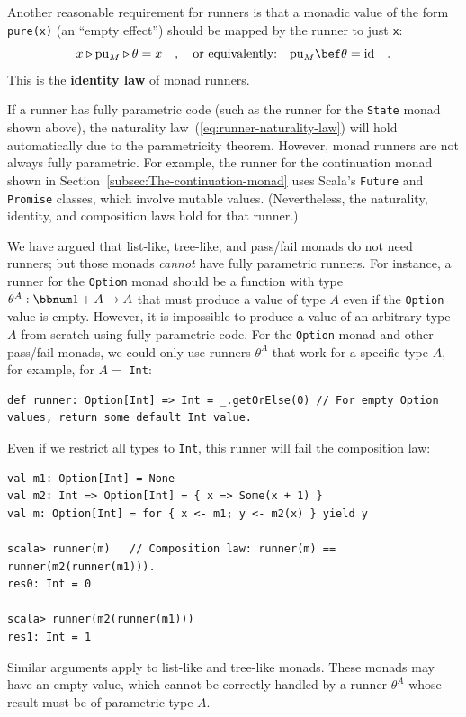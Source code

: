 \noindent Another reasonable requirement for runners is that a monadic
value of the form \lstinline!pure(x)! (an \textsf{``}empty effect\textsf{''}) should
be mapped by the runner to just \lstinline!x!:
\[
x\triangleright\text{pu}_{M}\triangleright\theta=x\quad,\quad\text{or equivalently:}\quad\text{pu}_{M}\bef\theta=\text{id}\quad.
\]
This is the \textbf{identity
law} of monad runners.

If a runner has fully parametric code (such as the runner for the
\lstinline!State! monad shown above), the naturality law~(\ref{eq:runner-naturality-law})
will hold automatically due to the parametricity theorem. However,
monad runners are not always fully parametric. For example, the runner
for the continuation monad shown in Section~\ref{subsec:The-continuation-monad}
uses Scala\textsf{'}s \lstinline!Future! and \lstinline!Promise! classes,
which involve mutable values. (Nevertheless, the naturality, identity,
and composition laws hold for that runner.)

We have argued that list-like, tree-like, and pass/fail monads do
not need runners; but those monads \emph{cannot} have fully parametric
runners. For instance, a runner for the \lstinline!Option! monad
should be a function with type $\theta^{A}:\bbnum 1+A\rightarrow A$
that must produce a value of type $A$ even if the \lstinline!Option!
value is empty. However, it is impossible to produce a value of an
arbitrary type $A$ from scratch using fully parametric code. For
the \lstinline!Option! monad and other pass/fail monads, we could
only use runners $\theta^{A}$ that work for a specific type $A$,
for example, for $A=$ \lstinline!Int!:
\begin{lstlisting}
def runner: Option[Int] => Int = _.getOrElse(0) // For empty Option values, return some default Int value.
\end{lstlisting}
Even if we restrict all types to \lstinline!Int!, this runner will
fail the composition law:
\begin{lstlisting}
val m1: Option[Int] = None
val m2: Int => Option[Int] = { x => Some(x + 1) }
val m: Option[Int] = for { x <- m1; y <- m2(x) } yield y

scala> runner(m)   // Composition law: runner(m) == runner(m2(runner(m1))).
res0: Int = 0

scala> runner(m2(runner(m1)))
res1: Int = 1
\end{lstlisting}
Similar arguments apply to list-like and tree-like monads. These monads
may have an empty value, which cannot be correctly handled by a runner
$\theta^{A}$ whose result must be of parametric type $A$. 

